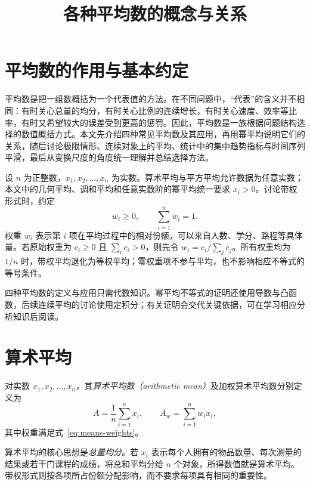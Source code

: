 \documentclass[UTF8,12pt,a4paper,fontset=fandol]{ctexart}
\title{各种平均数的概念与关系}
\author{}
\date{}
\begin{document}
\maketitle

\section{平均数的作用与基本约定}
\label{sec:means-introduction}

平均数是把一组数概括为一个代表值的方法。在不同问题中，“代表”的含义并不相同：有时关心总量的均分，有时关心比例的连续增长，有时关心速度、效率等比率，有时又希望较大的误差受到更高的惩罚。因此，平均数是一族根据问题结构选择的数值概括方式。本文先介绍四种常见平均数及其应用，再用幂平均说明它们的关系，随后讨论极限情形、连续对象上的平均、统计中的集中趋势指标与时间序列平滑，最后从变换尺度的角度统一理解并总结选择方法。

设 $n$ 为正整数，$x_1,x_2,\ldots,x_n$ 为实数。算术平均与平方平均允许数据为任意实数；本文中的几何平均、调和平均和任意实数阶的幂平均统一要求 $x_i>0$。讨论带权形式时，约定
\begin{equation}
\label{eq:means-weights}
  w_i\ge0,\qquad \sum_{i=1}^n w_i=1.
\end{equation}
权重 $w_i$ 表示第 $i$ 项在平均过程中的相对份额，可以来自人数、学分、路程等具体量。若原始权重为 $c_i\ge0$ 且 $\sum_i c_i>0$，则先令 $w_i=c_i/\sum_j c_j$。所有权重均为 $1/n$ 时，带权平均退化为等权平均；零权重项不参与平均，也不影响相应不等式的等号条件。

四种平均数的定义与应用只需代数知识。幂平均不等式的证明还使用导数与凸函数，后续连续平均的讨论使用定积分；有关证明会交代关键依据，可在学习相应分析知识后阅读。

\section{算术平均}
\label{sec:means-arithmetic}

\begin{definition}
对实数 $x_1,x_2,\ldots,x_n$，其\emph{算术平均数（arithmetic mean）}及加权算术平均数分别定义为
\begin{equation}
\label{eq:means-arithmetic}
  A=\frac{1}{n}\sum_{i=1}^n x_i,
  \qquad A_w=\sum_{i=1}^n w_i x_i,
\end{equation}
其中权重满足式~\eqref{eq:means-weights}。
\end{definition}

算术平均的核心思想是\emph{总量均分}。若 $x_i$ 表示每个人拥有的物品数量、每次测量的结果或若干门课程的成绩，将总和平均分给 $n$ 个对象，所得数值就是算术平均。带权形式则按各项所占份额分配影响，而不要求每项具有相同的重要性。
\end{document}
